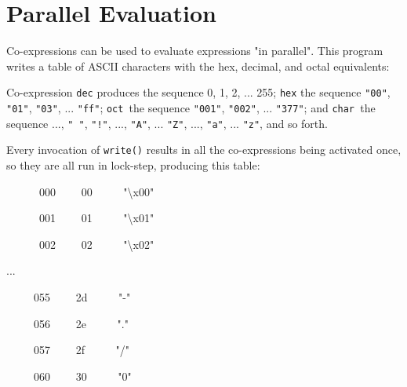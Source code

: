 \section{Parallel Evaluation}

Co-expressions can be used to evaluate
expressions "in parallel".
This program writes a table of ASCII characters with the
hex, decimal, and octal equivalents:


Co-expression \texttt{dec} produces the sequence 0, 1, 2, ... 255;
\texttt{hex} the sequence \texttt{"00"},
\texttt{"01"},
\texttt{"03"}, ...
\texttt{"ff"}; \texttt{oct}\texttt{ }the
sequence \texttt{"001"},
\texttt{"002"}, ...
\texttt{"377"}; and \texttt{char}\texttt{
}the sequence ..., \texttt{" "},
\texttt{"!"}, ...,
\texttt{"A"}, ...
\texttt{"Z"}, ...,
\texttt{"a"}, ...
\texttt{"z"}, and so forth.

Every invocation of \texttt{write()} results in all the co-expressions
being activated once, so they are all run in lock-step, producing this
table:

{ \ \ \ \ \ \ 000 \ \ \ \ 00
\ \ \ \ \ "{\textbackslash}x00"}

{ \ \ \ \ \ \ 001 \ \ \ \ 01
\ \ \ \ \ "{\textbackslash}x01"}

{ \ \ \ \ \ \ 002 \ \ \ \ 02
\ \ \ \ \ "{\textbackslash}x02"}

{\sffamily
...}

{ \ \ \ \ \ 055 \ \ \ \ 2d \ \ \ \ \ "-"}

{ \ \ \ \ \ 056 \ \ \ \ 2e \ \ \ \ \ "."}

{ \ \ \ \ \ 057 \ \ \ \ 2f \ \ \ \ \ "/"}

{ \ \ \ \ \ 060 \ \ \ \ 30 \ \ \ \ \ "0"}

